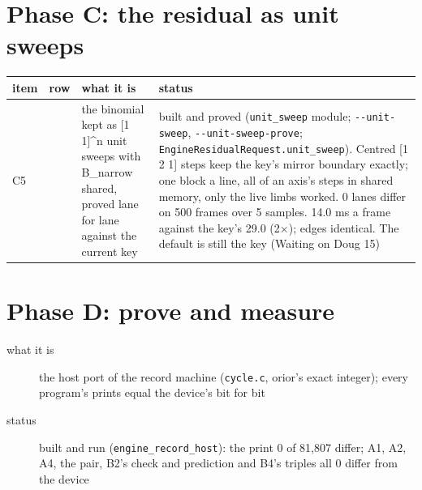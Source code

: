\section{\texorpdfstring{Phase C: the residual as unit sweeps}{Phase C: the residual as unit sweeps}}

{\footnotesize
\setlength{\tabcolsep}{6pt}
\begin{longtable}{>{\RaggedRight\arraybackslash}p{}>{\RaggedRight\arraybackslash}p{}>{\RaggedRight\arraybackslash}p{}>{\RaggedRight\arraybackslash}p{}}
\toprule
item & row & what it is & status \\
\midrule
\endhead
C5 & 3 & the binomial kept as [1 1]\textasciicircum{}n unit sweeps with B\_\allowbreak{}narrow shared, proved lane for lane against the current key & built and proved (\texttt{unit\_\allowbreak{}sweep} module; \texttt{-\allowbreak{}-\allowbreak{}unit-\allowbreak{}sweep}, \texttt{-\allowbreak{}-\allowbreak{}unit-\allowbreak{}sweep-\allowbreak{}prove}; \texttt{Engine\allowbreak{}Residual\allowbreak{}Request.\allowbreak{}unit\_\allowbreak{}sweep}). Centred [1 2 1] steps keep the key's mirror boundary exactly; one block a line, all of an axis's steps in shared memory, only the live limbs worked. 0 lanes differ on 500 frames over 5 samples. 14.0 ms a frame against the key's 29.0 (2×); edges identical. The default is still the key (Waiting on Doug 15) \\
\bottomrule
\end{longtable}
}

\section{\texorpdfstring{Phase D: prove and measure}{Phase D: prove and measure}}

\begin{description}
\item[{what it is}] the host port of the record machine (\texttt{cycle.\allowbreak{}c}, orior's exact integer); every program's prints equal the device's bit for bit
\item[{status}] built and run (\texttt{engine\_\allowbreak{}record\_\allowbreak{}host}): the print 0 of 81,807 differ; A1, A2, A4, the pair, B2's check and prediction and B4's triples all 0 differ from the device
\end{description}

